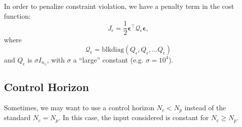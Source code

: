\documentclass[a4paper,12pt,fleqn]{article}
\newcommand{\nx}{n_x}
\newcommand{\varepsvec}{\bm{\epsilon}}
\newcommand{\slack}{\epsilon}
\newcommand{\Np}{{N_p}}
\newcommand{\Nc}{{N_c}}
\newcommand{\blkdiag}{\text{blkdiag}}
\begin{document}
In order to penalize constraint violation, we have a penalty term in the cost function:
\begin{equation}
 J_{\slack} = \frac{1}{2} \varepsvec^\top \mathcal{Q}_{\slack} \varepsvec,
\end{equation}
where 
\begin{equation}
\mathcal{Q}_{\slack} = \blkdiag(Q_{\slack}, Q_{\slack}, \dots Q_{\slack})
\end{equation}
and $Q_{\slack}$ is $\sigma I_{\nx}$, with $\sigma$ a ``large'' constant (e.g. $\sigma=10^4$).

\subsection{Control Horizon}
Sometimes, we may want to use a control horizon $\Nc < \Np$ instead of the standard $\Nc = \Np$. In this case, the input considered is constant for $\Nc \geq \Np$.
\end{document}
